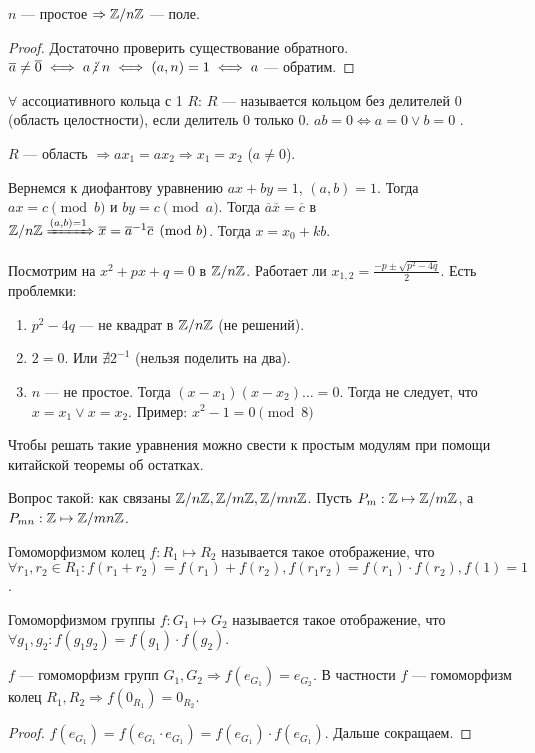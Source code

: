 \begin{consequence}
    $n$ --- простое  $\Rightarrow \mathbb{Z} / n\mathbb{Z}$ --- поле.
\end{consequence}
\begin{proof}
    Достаточно проверить существование обратного. $\overline{a} \neq \overline{0} \iff a \centernot\divby n \iff (a, n) = 1 \iff a$ --- обратим.
\end{proof}
\begin{definition}
    $\forall $ ассоциативного кольца с 1 $R$:  $R$ --- называется кольцом без делителей 0 (область целостности), если делитель 0 только 0.  $ab = 0 \iff a = 0 \lor b = 0$  .
\end{definition}
 \begin{remark}
     $R$ --- область  $\Rightarrow ax_1=ax_2 \Rightarrow x_1=x_2$ ($a \neq 0$).
\end{remark}
\slashn
Вернемся к диофантову уравнению $ax+by=1$, $(a, b) = 1$. Тогда $ax = c \pmod{b}$ и  $by = c \pmod{a}$. Тогда  $\overline{a}\overline{x}=\overline{c}$ в  $\mathbb{Z} / n\mathbb{Z} \xRightarrow{(a,b)=1} \overline{x} = \overline{a}^{-1}\overline{c} \pmod{b}$. Тогда $x = x_0+kb$.

Посмотрим на $x^2+px+q=0$ в  $\mathbb{Z} / n\mathbb{Z}$. Работает ли  $x_{1,2} = \frac{-p \pm \sqrt{p^2 - 4q}}{2}$. Есть проблемки:
 \begin{enumerate}
     \item $p^2 - 4q$ --- не квадрат в  $\mathbb{Z} / n\mathbb{Z}$ (не решений).
     \item $2 = 0$. Или  $\nexists 2^{-1}$ (нельзя поделить на два).
     \item  $n$ --- не простое. Тогда  $(x-x_1)(x-x_2)\ldots=0$. Тогда не следует, что $x = x_1 \lor x = x_2$. Пример: $x^2-1=0 \pmod{8}$
\end{enumerate}
Чтобы решать такие уравнения можно свести к простым модулям при помощи китайской теоремы об остатках.

Вопрос такой: как связаны $\mathbb{Z} / n\mathbb{Z}, \mathbb{Z} / m\mathbb{Z}, \mathbb{Z} / mn\mathbb{Z}$. Пусть $P_m: \mathbb{Z} \mapsto \mathbb{Z} / m\mathbb{Z}$, а $P_{mn}: \mathbb{Z} \mapsto \mathbb{Z} / mn\mathbb{Z}$. 

 \begin{definition}
     Гомоморфизмом колец $f: R_1 \mapsto R_2$ называется такое отображение, что $\forall r_1, r_2 \in R_1: f(r_1 + r_2) = f(r_1) + f(r_2), f(r_1r_2)=f(r_1)\cdot f(r_2), f(1) = 1$.
\end{definition}
\begin{definition}
    Гомоморфизмом группы $f: G_1 \mapsto G_2$ называется такое отображение, что $\forall g_1, g_2: f(g_1g_2) = f(g_1) \cdot f(g_2)$.
\end{definition}
\begin{remark}
    $f$ --- гомоморфизм групп  $G_1, G_2 \Rightarrow f(e_{G_1}) = e_{G_2}$.  В частности  $f$ --- гомоморфизм колец  $R_1,R_2 \Rightarrow f(0_{R_1}) = 0_{R_2}$.
\end{remark}
\begin{proof}
    $f(e_{G_1}) = f(e_{G_1} \cdot e_{G_1}) = f(e_{G_1}) \cdot f(e_{G_1})$. Дальше сокращаем.
\end{proof}
\slashn

